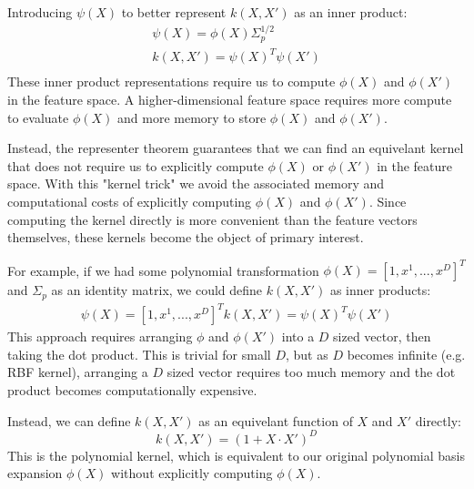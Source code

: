Introducing $\psi(X)$ to better represent $k(X,X')$ as an inner product:
\begin{equation*}
    \begin{aligned}
        \psi(X) = \phi(X)\Sigma_p^{1/2} \\
        k(X,X') = \psi(X)^T\psi(X') \\
    \end{aligned}
\end{equation*}
These inner product representations require us to compute $\phi(X)$ and $\phi(X')$ in the feature space. A higher-dimensional feature space requires more compute to evaluate $\phi(X)$ and more memory to store $\phi(X)$ and $\phi(X')$.

Instead, the representer theorem guarantees that we can find an equivelant kernel that does not require us to explicitly compute $\phi(X)$ or $\phi(X')$ in the feature space. With this "kernel trick" we avoid the associated memory and computational costs of explicitly computing $\phi(X)$ and $\phi(X')$. Since computing the kernel directly is more convenient than the feature vectors themselves, these kernels become the object of primary interest.


For example, if we had some polynomial transformation $\phi(X) = [1, x^1, ..., x^D]^T$ and $\Sigma_p$ as an identity matrix, we could define $k(X,X')$ as inner products:
\begin{equation*}
    \begin{aligned}
        \psi(X) = [1, x^1, ..., x^D]^T
        k(X,X') = \psi(X)^T\psi(X')
    \end{aligned}
\end{equation*}
This approach requires arranging $\phi$ and $\phi(X')$ into a $D$ sized vector, then taking the dot product. This is trivial for small $D$, but as $D$ becomes infinite (e.g. RBF kernel), arranging a $D$ sized vector requires too much memory and the dot product becomes computationally expensive.

Instead, we can define $k(X,X')$ as an equivelant function of $X$ and $X'$ directly:
\begin{equation*}
    k(X,X') = (1 + X \cdot X')^D
\end{equation*}
This is the polynomial kernel, which is equivalent to our original polynomial basis expansion $\phi(X)$ without explicitly computing $\phi(X)$.



